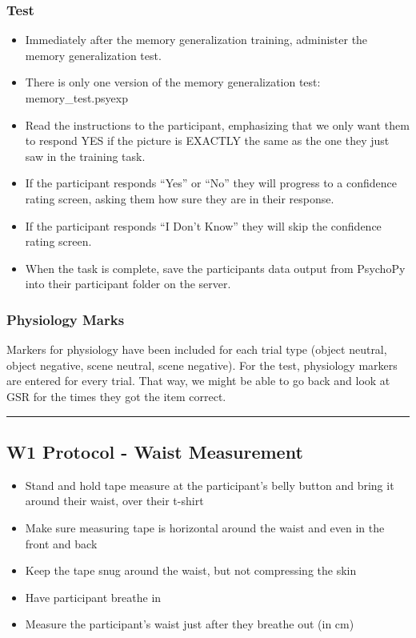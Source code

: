\documentclass[
]{book}
\providecommand{\tightlist}{%
  \setlength{\itemsep}{0pt}\setlength{\parskip}{0pt}}
\begin{document}
\hypertarget{test}{%
\subsubsection{Test}\label{test}}

\begin{itemize}
\tightlist
\item
  Immediately after the memory generalization training, administer the memory generalization test.
\item
  There is only one version of the memory generalization test: memory\_test.psyexp
\item
  Read the instructions to the participant, emphasizing that we only want them to respond YES if the picture is EXACTLY the same as the one they just saw in the training task.
\item
  If the participant responds ``Yes'' or ``No'' they will progress to a confidence rating screen, asking them how sure they are in their response.
\item
  If the participant responds ``I Don't Know'' they will skip the confidence rating screen.
\item
  When the task is complete, save the participants data output from PsychoPy into their participant folder on the server.
\end{itemize}

\hypertarget{physiology-marks}{%
\subsubsection{Physiology Marks}\label{physiology-marks}}

Markers for physiology have been included for each trial type (object neutral, object negative, scene neutral, scene negative). For the test, physiology markers are entered for every trial. That way, we might be able to go back and look at GSR for the times they got the item correct.

\begin{center}\rule{0.5\linewidth}{0.5pt}\end{center}

\hypertarget{w1-protocol---waist-measurement}{%
\subsection{W1 Protocol - Waist Measurement}\label{w1-protocol---waist-measurement}}

\begin{itemize}
\tightlist
\item
  Stand and hold tape measure at the participant's belly button and bring it around their waist, over their t-shirt
\item
  Make sure measuring tape is horizontal around the waist and even in the front and back
\item
  Keep the tape snug around the waist, but not compressing the skin
\item
  Have participant breathe in
\item
  Measure the participant's waist just after they breathe out (in cm)
\end{itemize}
\end{document}
